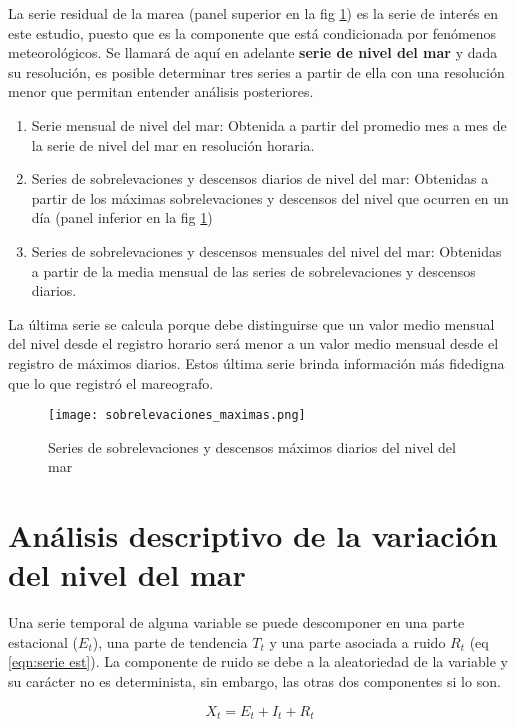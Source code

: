 La serie residual de la marea (panel superior en la fig \ref{fig:sobre}) es la serie de interés en este estudio, puesto que es la componente que está condicionada por fenómenos meteorológicos. Se llamará de aquí en adelante \textbf{serie de nivel del mar} y dada su resolución, es posible determinar tres series a partir de ella con una resolución menor que permitan entender análisis posteriores.

\begin{enumerate}
	\item Serie mensual de nivel del mar: Obtenida a partir del promedio mes a mes de la serie de nivel del mar en resolución horaria.
	\item Series de sobrelevaciones y descensos diarios de nivel del mar: Obtenidas a partir de los máximas sobrelevaciones y descensos del nivel que ocurren en un día (panel inferior en la fig \ref{fig:sobre})
	\item Series de sobrelevaciones y descensos mensuales del nivel del mar: Obtenidas a partir de la media mensual de las series de sobrelevaciones y descensos diarios.
\end{enumerate}

La última serie se calcula porque debe distinguirse que un valor medio mensual del nivel desde el registro horario será menor a un valor medio mensual desde el registro de máximos diarios. Estos última serie brinda información más fidedigna que lo que registró el mareografo. 

\begin{figure}[h]
	\centering
	\texttt{[image: sobrelevaciones\_maximas.png]}
	\caption{Series de sobrelevaciones y descensos máximos diarios del nivel del mar}
	\label{fig:sobre}
\end{figure}

\section{Análisis descriptivo de la variación del nivel del mar}

Una serie temporal de alguna variable se puede descomponer en una parte estacional ($E_{t}$), una parte de tendencia $T_{t}$ y una parte asociada a ruido $R_{t}$ (eq \ref{eqn:serie est}). La componente de ruido se debe a la aleatoriedad de la variable y su carácter no es determinista, sin embargo, las otras dos componentes si lo son. 

\begin{equation}
X_{t}=E_{t}+I_{t}+R_{t}
\label{eqn:serie est}
\end{equation}

